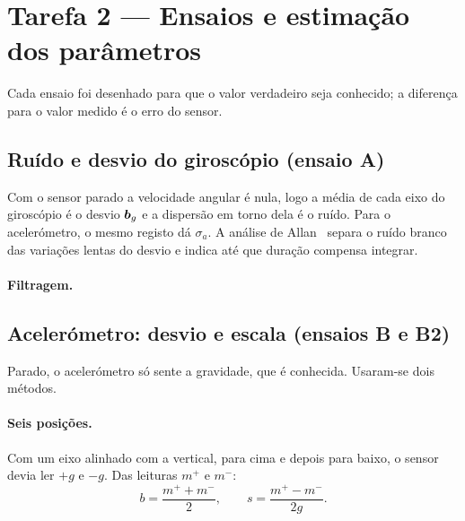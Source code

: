 \section{Tarefa 2 --- Ensaios e estimação dos parâmetros}
\label{sec:calib}

Cada ensaio foi desenhado para que o valor verdadeiro seja conhecido; a
diferença para o valor medido é o erro do sensor.

\subsection{Ruído e desvio do giroscópio (ensaio A)}

Com o sensor parado a velocidade angular é nula, logo a média de cada eixo do
giroscópio é o desvio $\boldsymbol{b}_g$ e a dispersão em torno dela é o ruído. Para
o acelerómetro, o mesmo registo dá $\sigma_a$. A análise de
Allan~\cite{elsheimy2008} separa o ruído branco das variações lentas do
desvio e indica até que duração compensa integrar.

\paragraph{Filtragem.} 

\begin{figure}[H]
\centering
{}
\caption{}
\label{fig:ruido}
\end{figure}

\subsection{Acelerómetro: desvio e escala (ensaios B e B2)}

Parado, o acelerómetro só sente a gravidade, que é conhecida. Usaram-se dois
métodos.

\paragraph{Seis posições.} Com um eixo alinhado com a vertical, para cima e
depois para baixo, o sensor devia ler $+g$ e $-g$. Das leituras $m^{+}$ e
$m^{-}$:
\begin{equation}
b = \frac{m^{+} + m^{-}}{2}, \qquad s = \frac{m^{+} - m^{-}}{2g}.
\end{equation}


